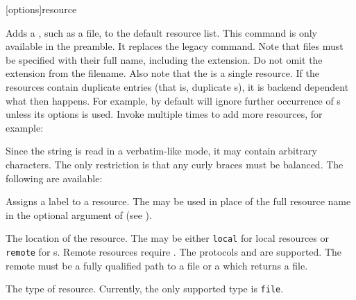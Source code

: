 \documentclass{ltxdockit}[2011/03/25]
\newcommand*{\biber}{\sty{biber}\xspace}
\begin{document}
\begin{ltxsyntax}

[options]{resource}

Adds a , such as a  file, to the default resource list. This command is only available in the preamble. It replaces the  legacy command. Note that files must be specified with their full name, including the extension. Do not omit the  extension from the filename. Also note that the  is a single resource. If the resources contain duplicate entries (that is, duplicate s), it is backend dependent what then happens. For example, by default \biber will ignore further occurrence of s unless its  options is used. Invoke  multiple times to add more resources, for example:

\begin{ltxexample}




\end{ltxexample}
%
Since the  string is read in a verbatim-like mode, it may contain arbitrary characters. The only restriction is that any curly braces must be balanced. The following  are available:

\begin{optionlist*}


Assigns a label to a resource. The  may be used in place of the full resource name in the optional argument of  (see ).


The location of the resource. The  may be either \texttt{local} for local resources or \texttt{remote} for s. Remote resources require \biber. The protocols  and  are supported. The remote  must be a fully qualified path to a  file or a  which returns a  file.


The type of resource. Currently, the only supported type is \texttt{file}.



\end{optionlist*}
\end{ltxsyntax}
\end{document}
